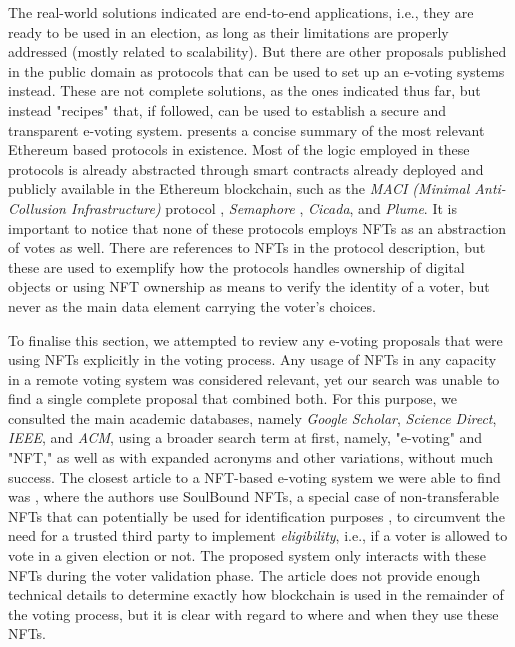 \documentclass[../main.tex]{subfiles}
\begin{document}
    \par
    The real-world solutions indicated are end-to-end applications, i.e., they are ready to be used in an election, as long as their limitations are properly addressed (mostly related to scalability). But there are other proposals published in the public domain as protocols that can be used to set up an e-voting systems instead. These are not complete solutions, as the ones indicated thus far, but instead "recipes" that, if followed, can be used to establish a secure and transparent e-voting system. \cite{Lamtzidis2023} presents a concise summary of the most relevant Ethereum based protocols in existence. Most of the logic employed in these protocols is already abstracted through smart contracts already deployed and publicly available in the Ethereum blockchain, such as the \textit{MACI (Minimal Anti-Collusion Infrastructure)} protocol \cite{MACI2024}, \textit{Semaphore} \cite{Semaphore2024}, \textit{Cicada}, and \textit{Plume}. It is important to notice that none of these protocols employs NFTs as an abstraction of votes as well. There are references to NFTs in the protocol description, but these are used to exemplify how the protocols handles ownership of digital objects or using NFT ownership as means to verify the identity of a voter, but never as the main data element carrying the voter's choices.
    \par
    To finalise this section, we attempted to review any e-voting proposals that were using NFTs explicitly in the voting process. Any usage of NFTs in any capacity in a remote voting system was considered relevant, yet our search was unable to find a single complete proposal that combined both. For this purpose, we consulted the main academic databases, namely \textit{Google Scholar}, \textit{Science Direct}, \textit{IEEE}, and \textit{ACM}, using a broader search term at first, namely, "e-voting" and "NFT," as well as with expanded acronyms and other variations, without much success. The closest article to a NFT-based e-voting system we were able to find was \cite{Sagar2023}, where the authors use SoulBound NFTs, a special case of non-transferable NFTs that can potentially be used for identification purposes \cite{Weyl2022}, to circumvent the need for a trusted third party to implement \textit{eligibility}, i.e., if a voter is allowed to vote in a given election or not. The proposed system only interacts with these NFTs during the voter validation phase. The article does not provide enough technical details to determine exactly how blockchain is used in the remainder of the voting process, but it is clear with regard to where and when they use these NFTs.
\end{document}
